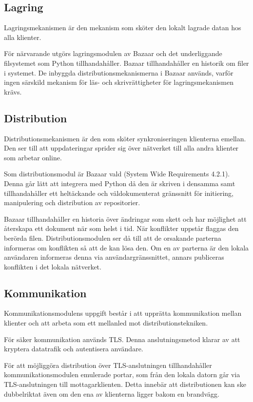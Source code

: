 \subsection{Lagring}
Lagringsmekanismen är den mekanism som sköter den lokalt lagrade datan
hos alla klienter.

För närvarande utgörs lagringsmodulen av Bazaar och det underliggande
filsystemet som Python tillhandahåller. Bazaar tillhandahåller en
historik om filer i systemet. De inbyggda distributionsmekanismerna i
Bazaar används, varför ingen särskild mekanism för läs- och
skrivrättigheter för lagringsmekanismen krävs.

\subsection{Distribution}
Distributionsmekanismen är den som sköter synkroniseringen klienterna
emellan. Den ser till att uppdateringar sprider sig över nätverket
till alla andra klienter som arbetar online.

Som distributionsmodul är Bazaar vald (System Wide Requirements 4.2.1). Denna går lätt att integrera
med Python då den är skriven i densamma samt tillhandahåller ett
heltäckande och väldokumenterat gränssnitt för initiering,
manipulering och distribution av repositorier.

Bazaar tillhandahåller en historia över ändringar som skett och har
möjlighet att återskapa ett dokument när som helst i tid. När
konflikter uppstår flaggas den berörda filen. Distributionsmodulen ser
då till att de orsakande parterna informeras om konflikten så att de
kan lösa den. Om en av parterna är den lokala användaren informeras
denna via användargränssnittet, annars publiceras konflikten i det
lokala nätverket.

\subsection{Kommunikation}
Kommunikationsmodulens uppgift består i att upprätta kommunikation
mellan klienter och att arbeta som ett mellanled mot
distributionstekniken.

För säker kommunikation används TLS. Denna anslutningsmetod klarar av
att kryptera datatrafik och autentisera användare.

För att möjliggöra distribution över TLS-anslutningen tillhandahåller
kommunikationsmodulen emulerade portar, som från den lokala datorn går
via TLS-anslutningen till mottagarklienten. Detta innebär att
distributionen kan ske dubbelriktat även om den ena av klienterna
ligger bakom en brandvägg.

